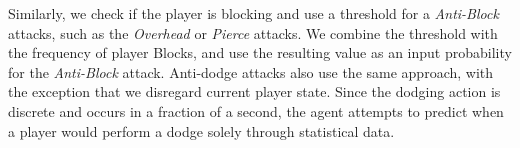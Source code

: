 Similarly, we check if the player is blocking and use a threshold for  a \emph{Anti-Block} attacks, such as the \emph{Overhead} or \emph{Pierce} attacks. We combine the threshold with the frequency of player Blocks, and use the resulting value as an input probability for the \emph{Anti-Block} attack. Anti-dodge attacks also use the same approach, with the exception that we disregard current player state. Since the dodging action is discrete and occurs in a fraction of a second, the agent attempts to predict when a player would perform a dodge solely through statistical data.





